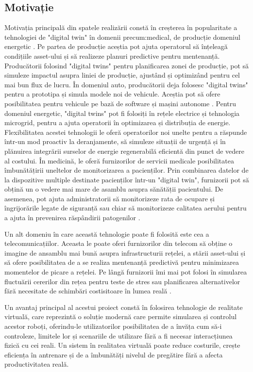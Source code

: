 \subsection{Motivație}
Motivația principală din spatele realizării constă în creșterea în popularitate a tehnologiei de "digital twin" în domenii precum:medical, de producție  domeniul energetic \cite{DigTwin}.
Pe partea de producție aceștia pot ajuta operatorul să înțeleagă condițiile asset-ului și să realizeze planuri predictive pentru mentenanță. Producătorii folosind "digital twins" pentru planificarea zonei de producție, pot să simuleze impactul asupra liniei de producție, ajustând și optimizând pentru cel mai bun flux de lucru. În domeniul auto, producătorii deja folosesc "digital twins" pentru a prototipa și simula modele noi de vehicule. Aceștia pot să ofere posibilitatea pentru vehicule pe bază de software și mașini autonome \cite{DT}.
Pentru domeniul energetic, "digital twins" pot fi folosiți în rețele electrice și tehnologia microgrid, pentru a ajuta operatorii în optimizarea și distribuția de energie. Flexibilitatea acestei tehnologii le oferă operatorilor noi unelte pentru a răspunde într-un mod proactiv la deranjamente, să simuleze situații de urgență și în plănuirea integrării surselor de energie regenerabilă eficientă din punct de vedere al costului.
În medicină, le oferă furnizorilor de servicii medicale posibilitatea îmbunătățirii uneltelor de monitorizarea a pacienților. Prin combinarea datelor de la dispozitive multiple destinate pacienților într-un "digital twin", furnizorii pot să obțină un o vedere mai mare de asamblu asupra sănătății pacientului. De asemenea, pot ajuta administratorii să monitorizeze rata de ocupare și îngrijorările legate de siguranță sau chiar să monitorizeze calitatea aerului pentru a ajuta în prevenirea răspândirii patogenilor \cite{DT}.

Un alt domeniu în care această tehnologie poate fi folosită este cea a telecomunicațiilor. Aceasta le poate oferi furnizorilor din telecom să obține o imagine de ansamblu mai bună asupra  infrastructurii rețelei, a stării asset-ului și să ofere posibilitatea de a se realiza mentenanță predictivă pentru minimizarea momentelor de picare a rețelei. Pe lângă furnizorii îmi mai pot folosi în simularea fluctuării cererilor din rețea pentru teste de stres sau planificarea alternativelor fără necesitate de schimbări costisitoare în lumea reală \cite{DT}.



Un avantaj principal al acestui proiect constă în folosirea tehnologie de realitate virtuală, care reprezintă o soluție modernă care permite simularea și controlul acestor roboți, oferindu-le utilizatorilor posibilitatea de a învăța cum să-i controleze, limitele lor și scenariile de utilizare fără a fi necesar interacțiunea fizică cu cei reali. Un sistem în realitatea virtuală poate reduce costurile, crește eficiența în antrenare și de a îmbunătăți nivelul de pregătire fără a afecta productivitatea reală.

